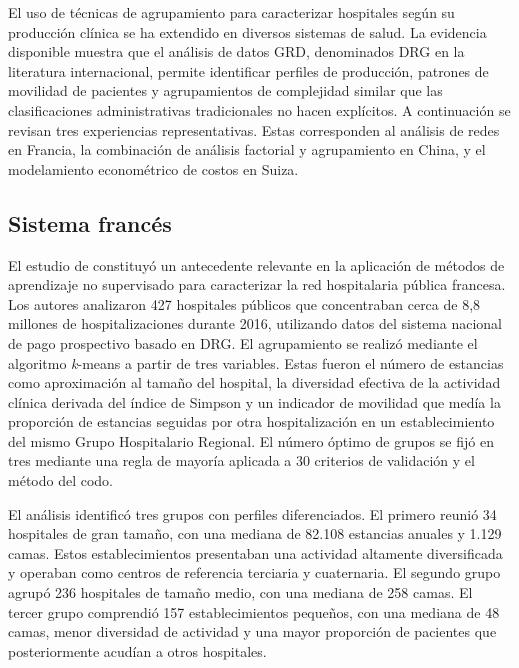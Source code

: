 El uso de técnicas de agrupamiento para caracterizar hospitales según su
producción clínica se ha extendido en diversos sistemas de salud. La evidencia
disponible muestra que el análisis de datos GRD, denominados DRG en la
literatura internacional, permite identificar perfiles de producción, patrones
de movilidad de pacientes y agrupamientos de complejidad similar que las
clasificaciones administrativas tradicionales no hacen explícitos. A
continuación se revisan tres experiencias representativas. Estas corresponden
al análisis de redes en Francia, la combinación de análisis factorial y
agrupamiento en China, y el modelamiento econométrico de costos en Suiza.

\subsection{Sistema francés}

\label{sec:francia}

El estudio de \citet{Chrusciel2021} constituyó un antecedente relevante en la
aplicación de métodos de aprendizaje no supervisado para caracterizar la red
hospitalaria pública francesa. Los autores analizaron 427 hospitales públicos
que concentraban cerca de 8{,}8 millones de hospitalizaciones durante 2016,
utilizando datos del sistema nacional de pago prospectivo basado en DRG. El
agrupamiento se realizó mediante el algoritmo \textit{k}-means a partir de tres
variables. Estas fueron el número de estancias como aproximación al tamaño del
hospital, la diversidad efectiva de la actividad clínica derivada del índice de
Simpson y un indicador de movilidad que medía la proporción de estancias seguidas
por otra hospitalización en un establecimiento del mismo Grupo Hospitalario
Regional. El número óptimo de grupos se fijó en tres mediante una regla de
mayoría aplicada a 30 criterios de validación y el método del codo.

El análisis identificó tres grupos con perfiles diferenciados. El primero reunió
34 hospitales de gran tamaño, con una mediana de 82.108 estancias anuales y
1.129 camas. Estos establecimientos presentaban una actividad altamente
diversificada y operaban como centros de referencia terciaria y cuaternaria. El
segundo grupo agrupó 236 hospitales de tamaño medio, con una mediana de 258
camas. El tercer grupo comprendió 157 establecimientos pequeños, con una mediana
de 48 camas, menor diversidad de actividad y una mayor proporción de pacientes
que posteriormente acudían a otros hospitales.

